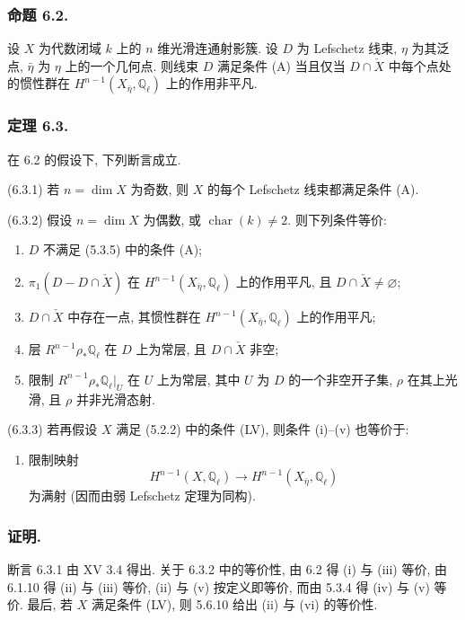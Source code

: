 \subsubsection*{命题 6.2.}
设 $X$ 为代数闭域 $k$ 上的 $n$ 维光滑连通射影簇. 设 $D$ 为 Lefschetz 线束, $\eta$ 为其泛点, $\bar\eta$ 为 $\eta$ 上的一个几何点. 则线束 $D$ 满足条件 (A) 当且仅当 $D\cap\check X$ 中每个点处的惯性群在 $H^{n-1}(X_{\bar\eta},\mathbb Q_\ell)$ 上的作用非平凡.

\subsubsection*{定理 6.3.}
在 6.2 的假设下, 下列断言成立.

\medskip
\noindent
\textup{(6.3.1)} 若 $n=\dim X$ 为奇数, 则 $X$ 的每个 Lefschetz 线束都满足条件 (A).

\medskip
\noindent
\textup{(6.3.2)} 假设 $n=\dim X$ 为偶数, 或 $\operatorname{char}(k)\ne2$. 则下列条件等价:
\begin{enumerate}
\item[(i)] $D$ 不满足 (5.3.5) 中的条件 (A);
\item[(ii)] $\pi_1(D-D\cap\check X)$ 在 $H^{n-1}(X_{\bar\eta},\mathbb Q_\ell)$ 上的作用平凡, 且
  $D\cap\check X\ne\varnothing$;
\item[(iii)] $D\cap\check X$ 中存在一点, 其惯性群在 $H^{n-1}(X_{\bar\eta},\mathbb Q_\ell)$ 上的作用平凡;
\item[(iv)] 层 $R^{n-1}\rho_*\mathbb Q_\ell$ 在 $D$ 上为常层, 且 $D\cap\check X$ 非空;
\item[(v)] 限制 $R^{n-1}\rho_*\mathbb Q_\ell\vert_U$ 在 $U$ 上为常层, 其中 $U$ 为 $D$ 的一个非空开子集, $\rho$ 在其上光滑, 且 $\rho$ 并非光滑态射.
\end{enumerate}

\noindent
\textup{(6.3.3)} 若再假设 $X$ 满足 (5.2.2) 中的条件 (LV), 则条件 (i)--(v) 也等价于:
\begin{enumerate}
\item[(vi)] 限制映射
\[
H^{n-1}(X,\mathbb Q_\ell)
\longrightarrow H^{n-1}(X_{\bar\eta},\mathbb Q_\ell)
\]
为满射 (因而由弱 Lefschetz 定理为同构).
\end{enumerate}

\subsubsection*{证明.}
断言 6.3.1 由 XV 3.4 得出. 关于 6.3.2 中的等价性, 由 6.2 得 (i) 与 (iii) 等价, 由 6.1.10 得 (ii) 与 (iii) 等价, (ii) 与 (v) 按定义即等价, 而由 5.3.4 得 (iv) 与 (v) 等价. 最后, 若 $X$ 满足条件 (LV), 则 5.6.10 给出 (ii) 与 (vi) 的等价性.

